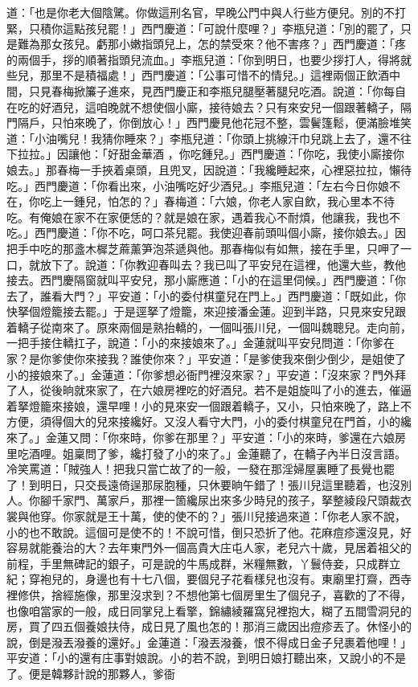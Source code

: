 \begin{showcontents}{}
道：「也是你老大個陰騭。你做這刑名官，早晚公門中與人行些方便兒。別的不打緊，只積你這點孩兒罷！」西門慶道：「可說什麼哩？」李瓶兒道：「別的罷了，只是難為那女孩兒。虧那小嫩指頭兒上，怎的禁受來？他不害疼？」西門慶道：「疼的兩個手，拶的順著指頭兒流血。」李瓶兒道：「你到明日，也要少拶打人，得將就些兒，那里不是積福處！」西門慶道：「公事可惜不的情兒。」這裡兩個正飲酒中間，只見春梅掀簾子進來，見西門慶正和李瓶兒腿壓著腿兒吃酒。說道：「你每自在吃的好酒兒，這咱晚就不想使個小廝，接待娘去？只有來安兒一個跟著轎子，隔門隔戶，只怕來晚了，你倒放心！」西門慶見他花冠不整，雲鬢篷鬆，便滿臉堆笑道：「小油嘴兒！我猜你睡來？」李瓶兒道：「你頭上挑線汗巾兒跳上去了，還不往下拉拉。」因讓他：「好甜金華酒 ，你吃鍾兒。」西門慶道：「你吃，我使小廝接你娘去。」那春梅一手挾着桌頭，且兜叉，因說道：「我纔睡起來，心裡惡拉拉，懶待吃。」西門慶道：「你看出來，小油嘴吃好少酒兒。」李瓶兒道：「左右今日你娘不在，你吃上一鍾兒，怕怎的？」春梅道：「六娘，你老人家自飲，我心里本不待吃。有俺娘在家不在家便恁的？就是娘在家，遇着我心不耐煩，他讓我，我也不吃。」西門慶道：「你不吃，呵口茶兒罷。我使迎春前頭叫個小廝，接你娘去。」因把手中吃的那盞木樨芝蔴薰笋泡茶遞與他。那春梅似有如無，接在手里，只呷了一口，就放下了。說道：「你教迎春叫去？我已叫了平安兒在這裡，他還大些，教他接去。西門慶隔窗就叫平安兒，那小廝應道：「小的在這里伺候。」西門慶道：「你去了，誰看大門？」平安道：「小的委付棋童兒在門上。」西門慶道：「既如此，你快拏個燈籠接去罷。」于是逕拏了燈籠，來迎接潘金蓮。迎到半路，只見來安兒跟着轎子從南來了。原來兩個是熟抬轎的，一個叫張川兒，一個叫魏聰兒。走向前，一把手接住轎扛子，說道：「小的來接娘來了。」金蓮就叫平安兒問道：「你爹在家？是你爹使你來接我？誰使你來？」平安道：「是爹使我來倒少倒少，是姐使了小的接娘來了。」金蓮道：「你爹想必衙門裡沒來家？」平安道：「沒來家？門外拜了人，從後晌就來家了，在六娘房裡吃的好酒兒。若不是姐旋叫了小的進去，催逼着拏燈籠來接娘，還早哩！小的見來安一個跟着轎子，又小，只怕來晚了，路上不方便，須得個大的兒來接纔好。又沒人看守大門，小的委付棋童兒在門首，小的纔來了。」金蓮又問：「你來時，你爹在那里？」平安道：「小的來時，爹還在六娘房里吃酒哩。姐稟問了爹，纔打發了小的來了。」金蓮聽了，在轎子內半日沒言語。冷笑罵道：「賊強人！把我只當亡故了的一般，一發在那淫婦屋裏睡了長覺也罷了！到明日，只交長遠倚逞那尿胞種，只休要晌午錯了！張川兒這里聽着，也沒別人。你腳千家門、萬家戶，那裡一箇纔尿出來多少時兒的孩子，拏整綾段尺頭裁衣裳與他穿。你家就是王十萬，使的使不的？」張川兒接過來道：「你老人家不說，小的也不敢說。這個可是使不的！不說可惜，倒只恐折了他。花麻痘疹還沒見，好容易就能養治的大？去年東門外一個高貴大庄屯人家，老兒六十歲，見居着祖父的前程，手里無碑記的銀子，可是說的牛馬成群，米糧無數，丫鬟侍妾，只成群立紀；穿袍兒的，身邊也有十七八個，要個兒子花看樣兒也沒有。東廟里打齋，西寺裡修供，捨經施像，那里沒求到？不想他第七個房里生了個兒子，喜歡的了不得，也像咱當家的一般，成日同掌兒上看擎，錦繡綾羅窩兒裡抱大，糊了五間雪洞兒的房，買了四五個養娘扶侍，成日見了風也怎的！那消三歲因出痘疹丟了。休怪小的說，倒是潑丟潑養的還好。」金蓮道：「潑丟潑養，恨不得成日金子兒裹着他哩！」平安道：「小的還有庄事對娘說。小的若不說，到明日娘打聽出來，又說小的不是了。便是韓夥計說的那夥人，爹衙
\end{showcontents}
